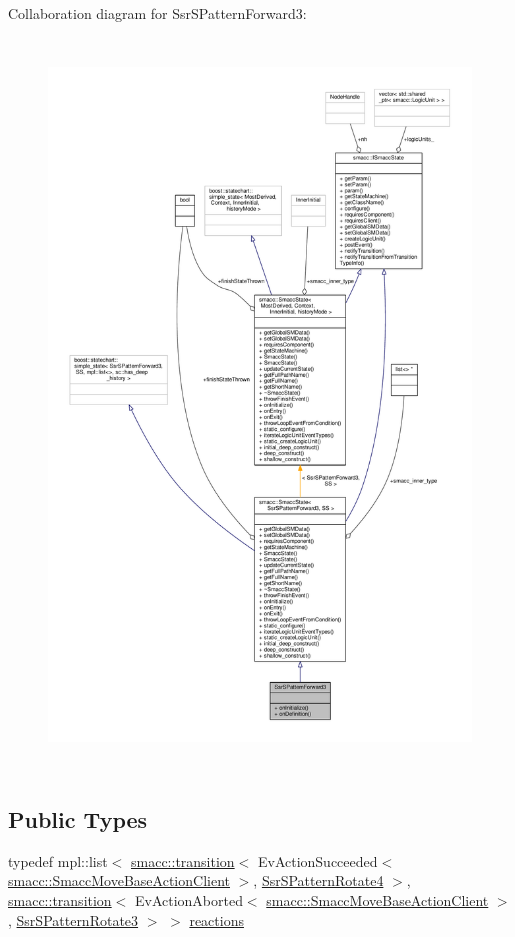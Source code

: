Collaboration diagram for Ssr\+S\+Pattern\+Forward3\+:
\nopagebreak
\begin{figure}[H]
\begin{center}
\leavevmode
\includegraphics[height=550pt]{structSsrSPatternForward3__coll__graph}
\end{center}
\end{figure}
\subsection*{Public Types}
\begin{DoxyCompactItemize}
\item 
typedef mpl\+::list$<$ \hyperlink{classsmacc_1_1transition}{smacc\+::transition}$<$ Ev\+Action\+Succeeded$<$ \hyperlink{classsmacc_1_1SmaccMoveBaseActionClient}{smacc\+::\+Smacc\+Move\+Base\+Action\+Client} $>$, \hyperlink{structSsrSPatternRotate4}{Ssr\+S\+Pattern\+Rotate4} $>$, \hyperlink{classsmacc_1_1transition}{smacc\+::transition}$<$ Ev\+Action\+Aborted$<$ \hyperlink{classsmacc_1_1SmaccMoveBaseActionClient}{smacc\+::\+Smacc\+Move\+Base\+Action\+Client} $>$, \hyperlink{structSsrSPatternRotate3}{Ssr\+S\+Pattern\+Rotate3} $>$ $>$ \hyperlink{structSsrSPatternForward3_a8328e936a0e30e6a11f4cc33d909d997}{reactions}
\end{DoxyCompactItemize}
